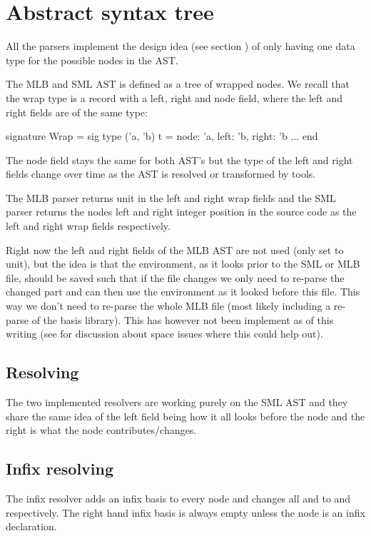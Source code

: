 \section{Abstract syntax tree}
All the parsers implement the design idea (see section )
of only having one data type for the possible nodes in the AST. 

The MLB and SML AST is defined as a tree of wrapped nodes. We recall that the
wrap type is a record with a left, right and node field, where the left and
right fields are of the same type:

\begin{sml}
signature Wrap =
sig
  type ('a, 'b) t = {node: 'a, left: 'b, right: 'b}
  ...
end
\end{sml}

The node field stays the same for both AST's but the type of the left and right
fields change over time as the AST is resolved or transformed by tools.

The MLB parser returns unit in the left and right wrap fields and the SML parser
returns the nodes left and right integer position in the source code as the left
and right wrap fields respectively.

Right now the left and right fields of the MLB AST are not used (only set to
unit), but the idea is that the environment, as it looks prior to the SML or MLB
file, should be saved such that if the file changes we only need to re-parse the
changed part and can then use the environment as it looked before this
file. This way we don't need to re-parse the whole MLB file (most likely
including a re-parse of the basis library). This has however not been implement
as of this writing (see  for discussion about space issues
where this could help out).

\subsection{Resolving}

The two implemented resolvers are working purely on the SML AST and they share
the same idea of the left field being how it all looks before the node and the
right is what the node contributes/changes.

\subsection{Infix resolving}

The infix resolver adds an infix basis to every node and changes all
 and  to  and 
respectively. The right hand infix basis is always empty unless the node is an infix
declaration.

